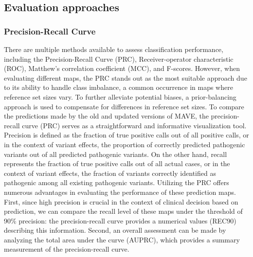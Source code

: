 \documentclass{article}
\begin{document}



\subsection{Evaluation approaches} 
\subsubsection{Precision-Recall Curve}

There are multiple methods available to assess classification performance, including the Precision-Recall Curve (PRC), Receiver-operator characteristic (ROC)\cite{doi:10.1161/CIRCULATIONAHA.105.594929}, Matthew's correlation coefficient (MCC)\cite{chicco2020advantages}, and F-scores\cite{hicks_evaluation_2022}. However, when evaluating different maps, the PRC stands out as the most suitable approach due to its ability to handle class imbalance, a common occurrence in maps where reference set sizes vary. To further alleviate potential biases, a prior-balancing approach\cite{wu_improved_2021} is used to compensate for differences in reference set sizes. 
To compare the predictions made by the old and updated versions of MAVE, the precision-recall curve (PRC) serves as a straightforward and informative visualization tool.  Precision is defined as the fraction of true positive calls out of all positive calls, or in the context of variant effects, the proportion of correctly predicted pathogenic variants out of all predicted pathogenic variants. On the other hand, recall represents the fraction of true positive calls out of all actual cases, or in the context of variant effects, the fraction of variants correctly identified as pathogenic among all existing pathogenic variants.\cite{Ting2010} 
Utilizing the PRC offers numerous advantages in evaluating the performance of these prediction maps.  First, since high precision is crucial in the context of clinical decision based on prediction, we can compare the recall level of these maps under the threshold of 90\% precision: the precision-recall curve provides a numerical values (REC90) describing this information. Second, an overall assessment can be made by analyzing the total area under the curve (AUPRC), which provides a summary measurement of the precision-recall curve. 
\end{document}

